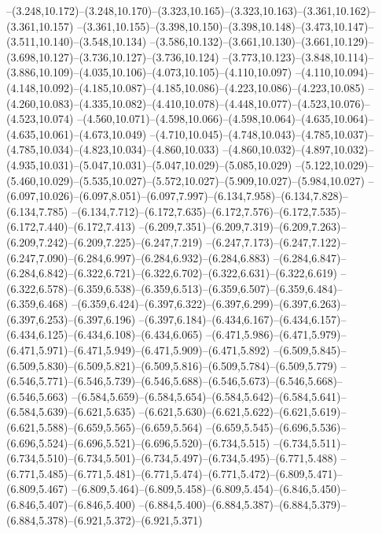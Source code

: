   --(3.248,10.172)--(3.248,10.170)--(3.323,10.165)--(3.323,10.163)--(3.361,10.162)--(3.361,10.157)%
  --(3.361,10.155)--(3.398,10.150)--(3.398,10.148)--(3.473,10.147)--(3.511,10.140)--(3.548,10.134)%
  --(3.586,10.132)--(3.661,10.130)--(3.661,10.129)--(3.698,10.127)--(3.736,10.127)--(3.736,10.124)%
  --(3.773,10.123)--(3.848,10.114)--(3.886,10.109)--(4.035,10.106)--(4.073,10.105)--(4.110,10.097)%
  --(4.110,10.094)--(4.148,10.092)--(4.185,10.087)--(4.185,10.086)--(4.223,10.086)--(4.223,10.085)%
  --(4.260,10.083)--(4.335,10.082)--(4.410,10.078)--(4.448,10.077)--(4.523,10.076)--(4.523,10.074)%
  --(4.560,10.071)--(4.598,10.066)--(4.598,10.064)--(4.635,10.064)--(4.635,10.061)--(4.673,10.049)%
  --(4.710,10.045)--(4.748,10.043)--(4.785,10.037)--(4.785,10.034)--(4.823,10.034)--(4.860,10.033)%
  --(4.860,10.032)--(4.897,10.032)--(4.935,10.031)--(5.047,10.031)--(5.047,10.029)--(5.085,10.029)%
  --(5.122,10.029)--(5.460,10.029)--(5.535,10.027)--(5.572,10.027)--(5.909,10.027)--(5.984,10.027)%
  --(6.097,10.026)--(6.097,8.051)--(6.097,7.997)--(6.134,7.958)--(6.134,7.828)--(6.134,7.785)%
  --(6.134,7.712)--(6.172,7.635)--(6.172,7.576)--(6.172,7.535)--(6.172,7.440)--(6.172,7.413)%
  --(6.209,7.351)--(6.209,7.319)--(6.209,7.263)--(6.209,7.242)--(6.209,7.225)--(6.247,7.219)%
  --(6.247,7.173)--(6.247,7.122)--(6.247,7.090)--(6.284,6.997)--(6.284,6.932)--(6.284,6.883)%
  --(6.284,6.847)--(6.284,6.842)--(6.322,6.721)--(6.322,6.702)--(6.322,6.631)--(6.322,6.619)%
  --(6.322,6.578)--(6.359,6.538)--(6.359,6.513)--(6.359,6.507)--(6.359,6.484)--(6.359,6.468)%
  --(6.359,6.424)--(6.397,6.322)--(6.397,6.299)--(6.397,6.263)--(6.397,6.253)--(6.397,6.196)%
  --(6.397,6.184)--(6.434,6.167)--(6.434,6.157)--(6.434,6.125)--(6.434,6.108)--(6.434,6.065)%
  --(6.471,5.986)--(6.471,5.979)--(6.471,5.971)--(6.471,5.949)--(6.471,5.909)--(6.471,5.892)%
  --(6.509,5.845)--(6.509,5.830)--(6.509,5.821)--(6.509,5.816)--(6.509,5.784)--(6.509,5.779)%
  --(6.546,5.771)--(6.546,5.739)--(6.546,5.688)--(6.546,5.673)--(6.546,5.668)--(6.546,5.663)%
  --(6.584,5.659)--(6.584,5.654)--(6.584,5.642)--(6.584,5.641)--(6.584,5.639)--(6.621,5.635)%
  --(6.621,5.630)--(6.621,5.622)--(6.621,5.619)--(6.621,5.588)--(6.659,5.565)--(6.659,5.564)%
  --(6.659,5.545)--(6.696,5.536)--(6.696,5.524)--(6.696,5.521)--(6.696,5.520)--(6.734,5.515)%
  --(6.734,5.511)--(6.734,5.510)--(6.734,5.501)--(6.734,5.497)--(6.734,5.495)--(6.771,5.488)%
  --(6.771,5.485)--(6.771,5.481)--(6.771,5.474)--(6.771,5.472)--(6.809,5.471)--(6.809,5.467)%
  --(6.809,5.464)--(6.809,5.458)--(6.809,5.454)--(6.846,5.450)--(6.846,5.407)--(6.846,5.400)%
  --(6.884,5.400)--(6.884,5.387)--(6.884,5.379)--(6.884,5.378)--(6.921,5.372)--(6.921,5.371)%
